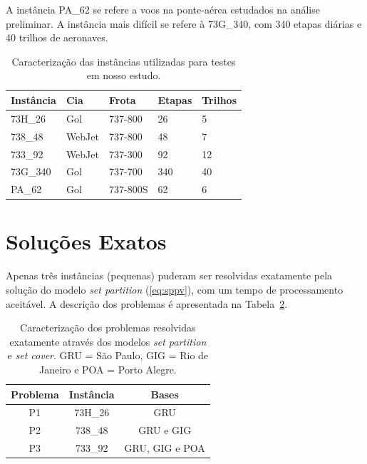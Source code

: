 A instância PA\_62 se refere a voos na ponte-aérea estudados na análise preliminar. A instância mais
difícil se refere à 73G\_340, com 340 etapas diárias e 40 trilhos de aeronaves.

\begin{table}[htb]
	\begin{center} 
		\begin{tabular}{|l|l|l|l|l|}
			\hline 
			{\bf Instância} & {\bf Cia} & {\bf Frota} & {\bf Etapas} & {\bf Trilhos} \\ 
			\hline \hline
			73H\_26 & Gol & 737-800 & 26 & 5 \\ 
			738\_48 & WebJet & 737-800 & 48 & 7 \\ 
			733\_92 & WebJet & 737-300 & 92 & 12 \\
			73G\_340 & Gol & 737-700 & 340 & 40 \\
			PA\_62 & Gol & 737-800S & 62 & 6 \\ \hline
		\end{tabular}
		\caption{Caracterização das instâncias utilizadas para testes em nosso estudo.}
		\label{tab:instancias}
	\end{center}
\end{table}


\section{Soluções Exatos}
\label{sec:solucoes_exatas}

Apenas três instâncias (pequenas) puderam ser resolvidas exatamente pela solução do modelo {\it set
partition} (\ref{eq:sppv}), com um tempo de processamento aceitável. A descrição dos problemas é
apresentada na Tabela~\ref{tab:problemas}.

\begin{table}[htb]
	\begin{center} 
		\begin{tabular}{|c|c|c|}
			\hline 
			{\bf Problema} & {\bf Instância} & {\bf Bases} \\ 
			\hline \hline
			P1 & 73H\_26 & GRU \\ 
			P2 & 738\_48 & GRU e GIG \\ 
			P3 & 733\_92 & GRU, GIG e POA \\ \hline
		\end{tabular}
		\caption{Caracterização dos problemas resolvidas exatamente através dos modelos 
		{\it set partition} e {\it set cover}. GRU = São Paulo, GIG = Rio de Janeiro e POA = Porto
    Alegre.}
		\label{tab:problemas}
	\end{center}
\end{table}

